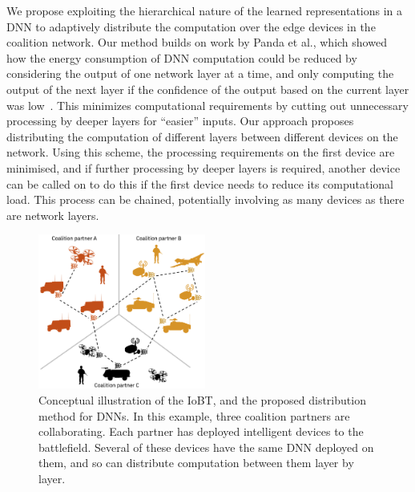 We propose exploiting the hierarchical nature of the learned representations in a DNN to adaptively distribute the computation over the edge devices in the coalition network. Our method builds on work by Panda et al., which showed how the energy consumption of DNN computation could be reduced by considering the output of one network layer at a time, and only computing the output of the next layer if the confidence of the output based on the current layer was low~\cite{Panda:2016}. This minimizes computational requirements by cutting out unnecessary processing by deeper layers for “easier” inputs. Our approach proposes distributing the computation of different layers between different devices on the network. Using this scheme, the processing requirements on the first device are minimised, and if further processing by deeper layers is required, another device can be called on to do this if the first device needs to reduce its computational load. This process can be chained, potentially involving as many devices as there are network layers.

\begin{figure}[ht]
\centering
\includegraphics[width=0.49\textwidth]{fig1.png}
\caption{Conceptual illustration of the IoBT, and the proposed distribution method for DNNs. In this example, three coalition partners are collaborating. Each partner has deployed intelligent devices to the battlefield. Several of these devices have the same DNN deployed on them, and so can distribute computation between them layer by layer.}
\label{fig:coalition}
\end{figure}